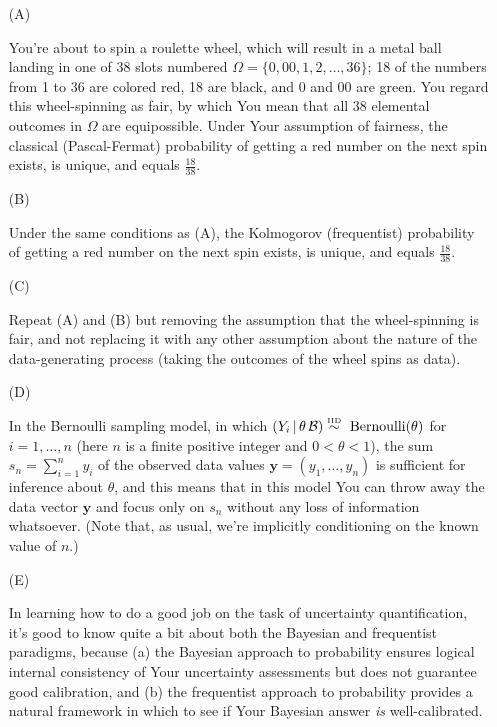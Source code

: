 \documentclass[12pt]{article}
\newcommand{\given}{\, | \,}
\begin{document}
\begin{itemize}

\item[(A)]

You're about to spin a roulette wheel, which will result in a metal ball
landing in one of 38 slots numbered $\Omega = \{ 0, 00, 1, 2, \dots, 36
\}$; 18 of the numbers from 1 to 36 are colored red, 18 are black, and 0
and 00 are green. You regard this wheel-spinning as fair, by which You mean
that all 38 elemental outcomes in $\Omega$ are equipossible. Under Your
assumption of fairness, the classical (Pascal-Fermat) probability of
getting a red number on the next spin exists, is unique, and equals $\frac{
18 }{ 38 }$.

\item[(B)]

Under the same conditions as (A), the Kolmogorov (frequentist) probability
of getting a red number on the next spin exists, is unique, and equals
$\frac{ 18 }{ 38 }$.

\item[(C)]

Repeat (A) and (B) but removing the assumption that the wheel-spinning is fair, and not replacing it with any other assumption about the nature of the data-generating process (taking the outcomes of the wheel spins as data).

\item[(D)]

In the Bernoulli sampling model, in which $( Y_i \given \theta \, \mathcal B ) \stackrel{ \textrm{\tiny IID} }{ \sim } \textrm{ Bernoulli} ( \theta )$ for $i = 1, \dots, n$ (here $n$ is a finite positive integer and $0 < \theta < 1$), the sum $s_n = \sum_{ i = 1 }^n y_i$ of the observed data values $\bm{ y } = ( y_1, \dots, y_n )$ is sufficient for inference about $\theta$, and this means that in this model You can throw away the data vector $\bm{ y }$ and focus only on $s_n$ without any loss of information whatsoever. (Note that, as usual, we're implicitly conditioning on the known value of $n$.)

\item[(E)]

In learning how to do a good job on the task of uncertainty quantification,
it's good to know quite a bit about both the Bayesian and frequentist
paradigms, because (a) the Bayesian approach to probability ensures logical
internal consistency of Your uncertainty assessments but does not guarantee
good calibration, and (b) the frequentist approach to probability provides
a natural framework in which to see if Your Bayesian answer \textit{is}
well-calibrated.


\end{itemize}
\end{document}
